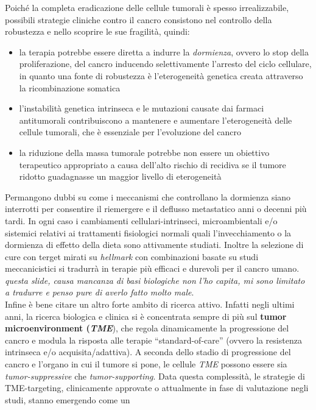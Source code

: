 \documentclass[a4paper,12pt, oneside]{book}
\begin{document}
Poiché la completa eradicazione delle cellule tumorali è spesso irrealizzabile,
possibili strategie cliniche contro il cancro consistono nel controllo della
robustezza e nello scoprire le sue fragilità, quindi:
\begin{itemize}
  \item la terapia potrebbe essere diretta a indurre la \textit{dormienza},
  ovvero lo stop della proliferazione, del cancro
  inducendo selettivamente l'arresto del ciclo cellulare, in quanto una fonte di
  robustezza è l'eterogeneità genetica creata attraverso la ricombinazione
  somatica 
  \item l'instabilità genetica intrinseca e le mutazioni causate dai farmaci
  antitumorali contribuiscono a mantenere e aumentare l'eterogeneità delle
  cellule tumorali, che è essenziale per l'evoluzione del cancro 
  \item la riduzione della massa tumorale potrebbe non essere un obiettivo
  terapeutico appropriato a causa dell'alto rischio di recidiva se il tumore
  ridotto guadagnasse un maggior livello di eterogeneità 
\end{itemize}
Permangono dubbi su come i meccanismi che controllano la dormienza siano
interrotti per consentire il riemergere e il deflusso metastatico anni o decenni
più tardi. In ogni caso  i cambiamenti cellulari-intrinseci, microambientali e/o
sistemici relativi ai trattamenti fisiologici normali quali l'invecchiamento o
la dormienza di effetto della dieta sono attivamente studiati. Inoltre la
selezione di cure con terget mirati su \textit{hellmark} con combinazioni basate
su studi meccanicistici si tradurrà in terapie più efficaci e durevoli per il
cancro umano.\\
\textit{questa slide, causa mancanza di basi biologiche non l’ho capita,
mi sono limitato a tradurre e penso pure di averlo fatto molto male}.\\
Infine è bene citare un altro forte ambito di ricerca attivo. Infatti negli
ultimi anni, la ricerca biologica e clinica si è concentrata sempre di più sul
\textbf{tumor microenvironment (\textit{TME}}), che regola dinamicamente la
progressione del 
cancro e modula la risposta alle terapie ``standard-of-care'' (ovvero la
resistenza intrinseca e/o acquisita/adattiva). A seconda dello stadio di
progressione del cancro e l'organo in cui il tumore si pone, le cellule
\textit{TME} 
possono essere sia \textit{tumor-suppressive} che \textit{tumor-supporting}. 
Data questa complessità, le strategie di TME-targeting, clinicamente approvate
o attualmente in fase di valutazione negli studi, stanno emergendo come un
\end{document}
